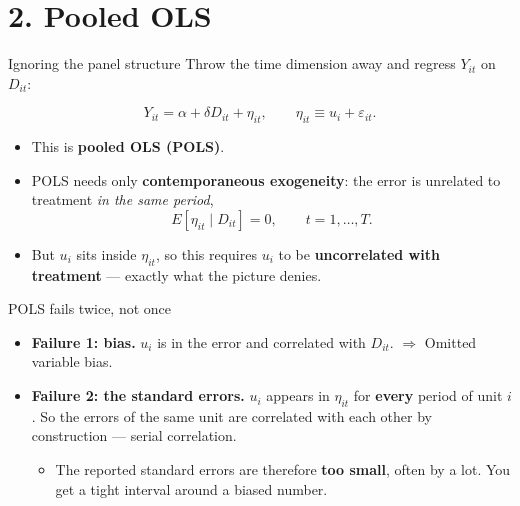 \documentclass[
  11pt,
  ignorenonframetext,
  aspectratio=169,
]{beamer}
\providecommand{\tightlist}{%
  \setlength{\itemsep}{0pt}\setlength{\parskip}{0pt}}
\begin{document}
\section{2. Pooled OLS}\label{pooled-ols}

\begin{frame}{Ignoring the panel structure}
\protect{}\label{ignoring-the-panel-structure}
Throw the time dimension away and regress \(Y_{it}\) on \(D_{it}\):

\[
Y_{it} = \alpha + \delta D_{it} + \eta_{it}, \qquad \eta_{it} \equiv u_i + \varepsilon_{it} .
\]

\begin{itemize}
\tightlist
\item
  This is \textbf{pooled OLS (POLS)}.
\item
  POLS needs only \textbf{contemporaneous exogeneity}: the error is
  unrelated to treatment \emph{in the same period}, \[
  E[\eta_{it} \mid D_{it}] = 0, \qquad t = 1, \dots, T .
  \]
\item
  But \(u_i\) sits inside \(\eta_{it}\), so this requires \(u_i\) to be
  \textbf{uncorrelated with treatment} --- exactly what the picture
  denies.
\end{itemize}
\end{frame}

\begin{frame}{POLS fails twice, not once}
\protect{}\label{pols-fails-twice-not-once}
\begin{itemize}
\tightlist
\item
  \textbf{Failure 1: bias.} \(u_i\) is in the error and correlated with
  \(D_{it}\). \(\Rightarrow\) Omitted variable bias.
\end{itemize}

\vspace{0.4em}

\begin{itemize}
\tightlist
\item
  \textbf{Failure 2: the standard errors.} \(u_i\) appears in
  \(\eta_{it}\) for \textbf{every} period of unit \(i\). So the errors
  of the same unit are correlated with each other by construction ---
  serial correlation.

  \begin{itemize}
  \tightlist
  \item
    The reported standard errors are therefore \textbf{too small}, often
    by a lot. You get a tight interval around a biased number.
  \end{itemize}
\end{itemize}
\end{frame}
\end{document}

